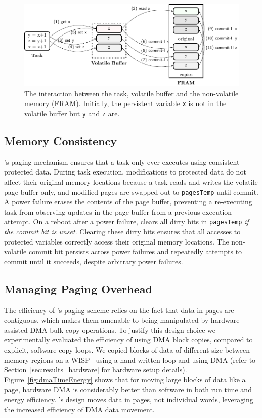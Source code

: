\begin{figure}[t]
	\centering
	\includegraphics[width=0.75\columnwidth]{figures/sram-buffer}
	\caption{The interaction between the task, volatile buffer and the non-volatile memory (FRAM). Initially, the persistent variable \texttt{x} is not in the volatile buffer but \texttt{y} and \texttt{z} are.}
	\label{fig:volatile-buffer}
\end{figure}

\subsection{Memory Consistency}

\sys's paging mechanism ensures that a task only ever executes using consistent protected data. During task execution, modifications to protected data do not affect their original memory locations because a task reads and writes the volatile page buffer only, and modified pages are swapped out to \texttt{pagesTemp} until commit. A power failure erases the contents of the page buffer, preventing a re-executing task from observing updates in the page buffer from a previous execution attempt. On a reboot after a power failure,
\sys clears all dirty bits in {\tt pagesTemp} {\em if the commit bit is unset}. Clearing these dirty bits ensures that all accesses to protected variables correctly access their original memory locations. The non-volatile commit bit persists across power failures and \sys repeatedly attempts to commit until it succeeds, despite arbitrary power failures.

\subsection{Managing Paging Overhead}

The efficiency of \sys's paging scheme relies on the fact that data in pages are contiguous, which makes them amenable to being manipulated by hardware assisted DMA bulk copy operations. To justify this design choice we experimentally evaluated the efficiency of using DMA block copies, compared to explicit, software copy loops. We copied blocks of data of different size between memory regions on a WISP~\cite{wisp} using a hand-written loop and using DMA (refer to Section~\ref{sec:results_hardware} for hardware setup details). Figure~\ref{fig:dmaTimeEnergy} shows that for moving large blocks of data like a page, hardware DMA is considerably better than software in both run time and energy efficiency. \sys's design moves data in pages, not individual words, leveraging the increased efficiency of DMA data movement.

